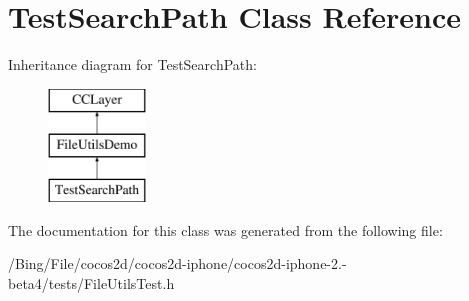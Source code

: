 \hypertarget{interface_test_search_path}{\section{Test\-Search\-Path Class Reference}
\label{interface_test_search_path}
}
Inheritance diagram for Test\-Search\-Path\-:\begin{figure}[H]
\begin{center}
\leavevmode
\includegraphics[height=3.000000cm]{interface_test_search_path}
\end{center}
\end{figure}


The documentation for this class was generated from the following file\-:\begin{DoxyCompactItemize}
\item 
/\-Bing/\-File/cocos2d/cocos2d-\/iphone/cocos2d-\/iphone-\/2.-\/beta4/tests/File\-Utils\-Test.\-h\end{DoxyCompactItemize}
